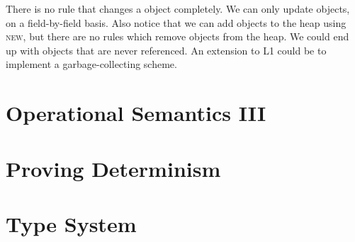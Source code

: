 \frmrule

There is no rule that changes a object completely.
We can only update objects, on a field-by-field basis.
Also notice that we can add objects to the heap using \textsc{new},
but there are no rules which remove objects from the heap. 
We could end up with objects that are never referenced. 
An extension to L1 could be to implement a garbage-collecting scheme.




\section{Operational Semantics III}


\section{Proving Determinism}


\section{Type System}